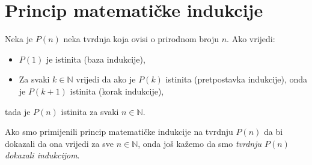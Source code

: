 \section{Princip matematičke indukcije}
\begin{remark}
\label{20}
Neka je \(P(n)\) neka tvrdnja koja ovisi o prirodnom broju \(n\). Ako vrijedi:
\begin{itemize}
\item \(P(1)\) je istinita (baza indukcije),
\item Za svaki \(k\in \mathbb{N}\) vrijedi da ako je \(P(k)\) istinita (pretpostavka indukcije), onda je \(P(k+1)\) istinita (korak indukcije),
\end{itemize}
tada je \(P(n)\) istinita za svaki \(n\in \mathbb{N}\).
\end{remark}

\begin{remark}
\label{22}
Ako smo primijenili princip matematičke indukcije na tvrdnju \(P(n)\) da bi dokazali da ona vrijedi za sve \(n\in \mathbb{N}\), onda još kažemo da smo \textit{tvrdnju \(P(n)\) dokazali indukcijom}.
\end{remark}

